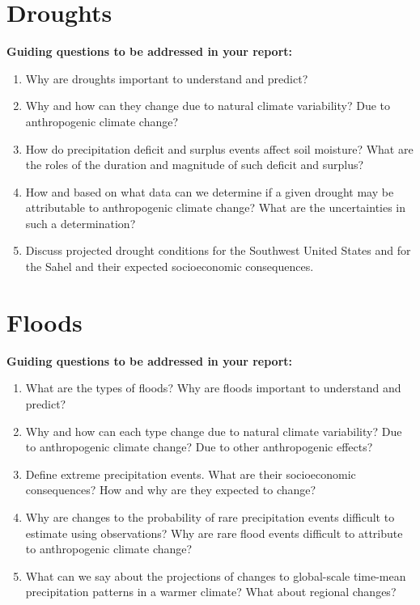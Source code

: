 \documentclass[12pt]{article}
\begin{document}
\section*{Droughts}
  \textbf{Guiding questions to be addressed in your report:}
    \begin{enumerate}
    \item Why are droughts important to understand and predict?
    \item Why and how can they change due to natural climate variability? Due to anthropogenic climate change?
    \item How do precipitation deficit and surplus events affect soil moisture? What are the roles of the duration and magnitude of such deficit and surplus?
    \item How and based on what data can we determine if a given drought may be attributable to anthropogenic climate change? What are the uncertainties in such a determination?
    \item Discuss projected drought conditions for the Southwest United States and for the Sahel and their expected socioeconomic consequences.
    \end{enumerate}

\section*{Floods}
\textbf{Guiding questions to be addressed in your report:}
    \begin{enumerate}
    \item What are the types of floods? Why are floods important to understand and predict?
    \item Why and how can each type change due to natural climate variability? Due to anthropogenic climate change? Due to other anthropogenic effects?
    \item Define extreme precipitation events. What are their socioeconomic consequences? How and why are they expected to change? 
    \item Why are changes to the probability of rare precipitation events difficult to estimate using observations? Why are rare flood events difficult to attribute to anthropogenic climate change?
    \item What can we say about the projections of changes to global-scale time-mean precipitation patterns in a warmer climate? What about regional changes?
    \end{enumerate}
\end{document}
